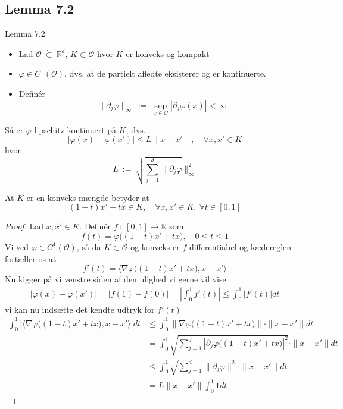 \subsection{Lemma 7.2}
\begin{boks}{Lemma 7.2}
  \begin{itemize}[label = $\ast$]
    \item Lad $\mathcal{O} \ \dot{\subset} \ \mathbb{R}^d$, $K \subset \mathcal{O}$ hvor $K$ er konveks og kompakt
    \item $\varphi \in C^1(\mathcal{O})$, dvs. at de partielt afledte eksisterer og er kontinuerte.
    \item Definér
    $$ \| \partial_j \varphi \|_\infty \ := \ \sup_{x \in \mathcal{O}} | \partial_j \varphi(x) | < \infty$$
  \end{itemize}
  Så er $\varphi$ lipschitz-kontinuert på $K$, dvs.
  $$ | \varphi(x) - \varphi(x') | \leq L \| x - x' \|, \quad \forall x,x' \in K$$
  hvor
  $$ L \ := \ \sqrt{\sum_{j = 1}^d \| \partial_j \varphi} \|^2_\infty $$
\end{boks}
At $K$ er en konveks mængde betyder at
$$ (1 - t)x' + tx \in K, \quad \forall x,x' \in K, \ \forall t \in [0,1] $$
\begin{proof}
  Lad $x,x' \in K$.
  Definér $f \ : \ [0,1] \rightarrow \mathbb{R}$ som
  $$ f(t) = \varphi\Big( (1 - t)x' + tx \Big), \quad 0 \leq t \leq 1 $$
  Vi ved $\varphi \in C^1(\mathcal{O})$, så da $K \subset \mathcal{O}$ og konveks er $f$ differentiabel og kædereglen fortæller os at
  $$ f'(t) = \langle \nabla \varphi\big( (1 - t)x' + tx \big), x - x' \rangle $$
  Nu kigger på vi venstre siden af den ulighed vi gerne vil vise
  \begin{align*}
    | \varphi(x) - \varphi(x') | =
    | f(1) - f(0) | =
    \left| \int_0^1 f'(t) \right| \leq
    \int_0^1 |f'(t)| dt
  \end{align*}
  vi kan nu indsætte det kendte udtryk for $f'(t)$
  \begin{align*}
    \int_0^1 | \langle \nabla \varphi\big( (1 - t)x' + tx \big), x - x' \rangle| dt &\leq \int_0^1 \| \nabla \varphi \big( (1 - t)x' + tx \big) \| \cdot \| x - x' \| dt \\
    &= \int_0^1 \sqrt{\sum_{j = 1}^d | \partial_j \varphi\big( (1 - t)x' + tx \big) |^2 } \cdot \| x - x' \| dt \\
    &\leq \int_0^1 \sqrt{\sum_{j = 1}^d \| \partial_j \varphi \|^2 } \cdot \| x - x' \| dt \\
    &= L \| x - x' \| \int_0^1 1 dt
  \end{align*}
\end{proof}

